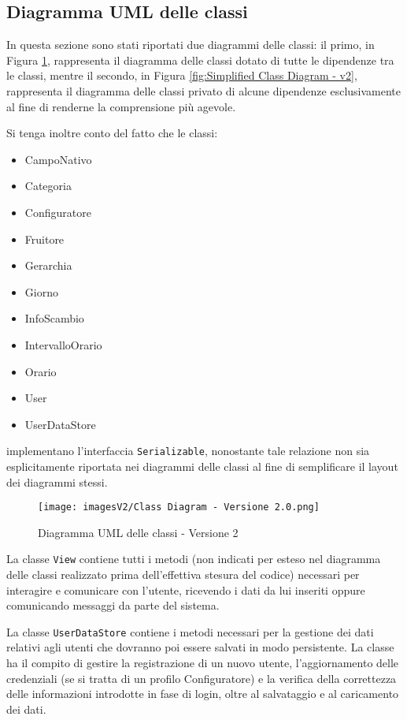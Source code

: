 \subsection{Diagramma UML delle classi}
In questa sezione sono stati riportati due diagrammi delle classi: il primo, in Figura \ref{fig:Class Diagram - v2}, rappresenta il diagramma delle classi dotato di tutte le dipendenze tra le classi, mentre il secondo, in Figura \ref{fig:Simplified Class Diagram - v2}, rappresenta il diagramma delle classi privato di alcune dipendenze esclusivamente al fine di renderne la comprensione più agevole.

Si tenga inoltre conto del fatto che le classi:
\begin{itemize}
    \item CampoNativo
    \item Categoria
    \item Configuratore
    \item Fruitore
    \item Gerarchia
    \item Giorno
    \item InfoScambio
    \item IntervalloOrario
    \item Orario
    \item User
    \item UserDataStore
\end{itemize}
implementano l'interfaccia \texttt{Serializable}, nonostante tale relazione non sia esplicitamente riportata nei diagrammi delle classi al fine di semplificare il layout dei diagrammi stessi.

\begin{figure}[h!]
    \centering
    \texttt{[image: imagesV2/Class Diagram - Versione 2.0.png]}
    \caption{\label{fig:Class Diagram - v2}Diagramma UML delle classi - Versione 2}
\end{figure} 

La classe \texttt{View} contiene tutti i metodi (non indicati per esteso nel diagramma delle classi realizzato prima dell'effettiva stesura del codice) necessari per interagire e comunicare con l'utente, ricevendo i dati da lui inseriti oppure comunicando messaggi da parte del sistema.

La classe \texttt{UserDataStore} contiene i metodi necessari per la gestione dei dati relativi agli utenti che dovranno poi essere salvati in modo persistente. La classe ha il compito di gestire la registrazione di un nuovo utente, l'aggiornamento delle credenziali (se si tratta di un profilo Configuratore) e la verifica della correttezza delle informazioni introdotte in fase di login, oltre al salvataggio e al caricamento dei dati. 

